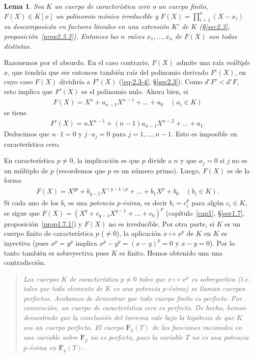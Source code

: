 \documentclass[bibtotoc,leqno,spanish]{amsbook}
\newcommand{\FF}{\mathbf{F}}
\numberwithin{equation}{section}
\newenvironment{comm}%
	{\begin{quotation}\itshape\Small}
	{\end{quotation}}
\theoremstyle{note}
\theoremstyle{note}
\newtheorem*{lemma*}{Lema}
\theoremstyle{rem}
\numberwithin{theorem}{section}
\numberwithin{proposition}{section}
\numberwithin{definition}{section}
\numberwithin{lemma}{section}
\numberwithin{corollary}{section}
\numberwithin{example}{section}
\numberwithin{footnote}{section}%
\begin{document}
\begin{lemma*}
Sea $K$ un cuerpo de caracter\'istica cero o un cuerpo finito, $F(X)\in K[x]$ un polinomio m\'onico
irreducible y $F(X) = \prod_{i=1}^{n}(X-x_{i})$ su descomposic\'on en factores lineales en una extensi\'on
$K'$ de $K$ (\S\ref{sec2.3}, proposici\'on~\ref{prop2.3.3}). Entonces
las $n$ ra\'ices $x_{1},\dots,x_{n}$ de $F(X)$ son todas distintas.
\end{lemma*}

Razonemos por el absurdo. En el caso contrario, $F(X)$ admite una ra\'iz \emph{m\'ultiple} $x$, que
tendr\'ia que ser entonces tambi\'en ra\'iz del polinomio derivado $F'(X)$, en cuyo caso $F(X)$
dividir\'ia a $F'(X)$ (\eqref{eq-2.3-4}, \S\ref{sec2.3}). Como $d^{\circ}F' < d^{\circ}F$, esto implica que $F'(X)$ es el
polinomio nulo. Ahora bien, si
\begin{gather*}
F(X) = X^{n}+a_{n-1}X^{n-1}+\dots+a_{0}\quad(a_{i}\in K)
\end{gather*}
se tiene
\begin{gather*}
F'(X) = nX^{n-1}+(n-1)a_{n-1}X^{n-2}+\dots+a_{1}.
\end{gather*}
Deducimos que $n\cdot 1 = 0$ y $j\cdot a_{j} = 0$ para $j=1,\dots,n-1$. Esto es imposible en caracter\'istica
cero.

En caracter\'istica $p\neq 0$, la implicaci\'on es que $p$ divide a $n$ y que $a_{j} = 0$ si $j$ no es
un m\'ultiplo de $p$ (recordemos que $p$ es un n\'umero primo). Luego, $F(X)$ es de la forma
\begin{gather*}
F(X) = X^{qp}+b_{q-1}X^{(q-1)p}+\dots+b_{1}X^{p}+b_{0}\quad(b_{i}\in K).
\end{gather*}
Si cada uno de los $b_{i}$ es una \emph{potencia $p$-\'esima,} es decir $b_{i} = c_{i}^{p}$ para
alg\'un $c_{i}\in K$, se sigue que $F(X) = (X^{q}+c_{q-1}X^{q-1}+\dots+c_{0})^{p}$ (cap\'itulo~\ref{cap1}, \S\ref{sec1.7},
proposici\'on~\ref{prop1.7.1}) y $F(X)$ no es irreducible. Por otra parte, si $K$ es un cuerpo finito de caracter\'istica $p$
($\neq 0$), la aplicaci\'on $x\mapsto x^{p}$ de $K$ en $K$ es inyectiva (pues
$x^{p}=y^{p}$ implica $x^{p}-y^{p} = (x-y)^{p} = 0$ y $x-y=0$). Por lo tanto tambi\'en es sobreyectiva
pues $K$ es finito. Hemos obtenido una una contradicci\'on.

\begin{comm}
Los cuerpos $K$ de caracter\'istica $p\neq 0$ tales que $x\mapsto x^{p}$ es sobreyectiva
(i.e. tales que todo elemento de $K$ es una potencia $p$-\'esima) se llaman cuerpos \emph{perfectos.}
Acabamos de demostrar que todo cuerpo finito es perfecto. Por convenci\'on, un cuerpo de caracter\'istica
cero es perfecto. De hecho, hemos demostrado que la conclusi\'on del teorema vale bajo la hip\'otesis
de que $K$ sea un cuerpo perfecto. El cuerpo $\FF_{p}(T)$ de las funciones racionales en une variable
sobre $\FF_{p}$ no es perfecto, pues la variable $T$ no es una potencia $p$-\'esima en $\FF_{p}(T)$.
\end{comm}
\end{document}
